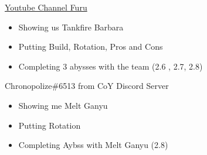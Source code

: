 \documentclass[11pt]{article}
\begin{document}
\href{https://www.youtube.com/c/furu212}{Youtube Channel Furu}

\begin{itemize}
    \item Showing us Tankfire Barbara
    \item Putting Build, Rotation, Pros and Cons
    \item Completing 3 abysses with the team (2.6 , 2.7, 2.8)
\end{itemize}

Chronopolize\#6513 from CoY Discord Server

\begin{itemize}
    \item Showing me Melt Ganyu
    \item Putting Rotation
    \item Completing Aybss with Melt Ganyu (2.8)
\end{itemize}
\end{document}
